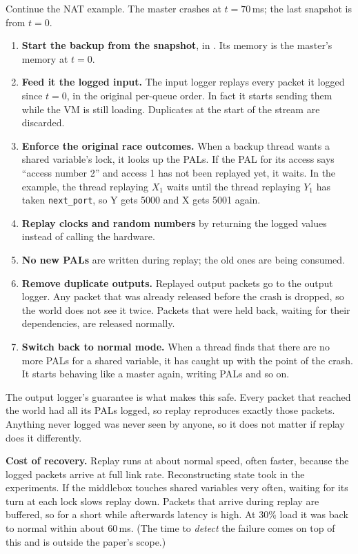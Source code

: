 Continue the NAT example. The master crashes at $t = 70$\,ms; the last snapshot is from $t = 0$.
\begin{enumerate}
  \item \textbf{Start the backup from the snapshot}, in . Its memory is the master's memory at $t = 0$.
  \item \textbf{Feed it the logged input.} The input logger replays every packet it logged since $t = 0$, in the original per-queue order. In
        fact it starts sending them while the VM is still loading. Duplicates at the start of the stream are discarded.
  \item \textbf{Enforce the original race outcomes.} When a backup thread wants a shared variable's lock, it looks up the PALs. If the PAL for its
        access says ``access number 2'' and access 1 has not been replayed yet, it waits. In the example, the thread replaying $X_1$
        waits until the thread replaying $Y_1$ has taken \texttt{next\_port}, so Y gets 5000 and X gets 5001 again.
  \item \textbf{Replay clocks and random numbers} by returning the logged values instead of calling the hardware.
  \item \textbf{No new PALs} are written during replay; the old ones are being consumed.
  \item \textbf{Remove duplicate outputs.} Replayed output packets go to the output logger. Any packet that was already released before the
        crash is dropped, so the world does not see it twice. Packets that were held back, waiting for their dependencies, are released normally.
  \item \textbf{Switch back to normal mode.} When a thread finds that there are no more PALs for a shared variable, it has caught up with the
        point of the crash. It starts behaving like a master again, writing PALs and so on.
\end{enumerate}

The output logger's guarantee is what makes this safe. Every packet that reached the world had all its PALs logged, so replay reproduces
exactly those packets. Anything never logged was never seen by anyone, so it does not matter if replay does it differently.

\textbf{Cost of recovery.} Replay runs at about normal speed, often faster, because the logged packets arrive at full link rate.
Reconstructing state took  in the experiments. If the middlebox touches shared variables very often, waiting for its
turn at each lock slows replay down. Packets that arrive during replay are buffered, so for a short while afterwards latency is high.
At 30\% load it was back to normal within about 60\,ms. (The time to \emph{detect} the failure comes on top of this and is outside the paper's scope.)

